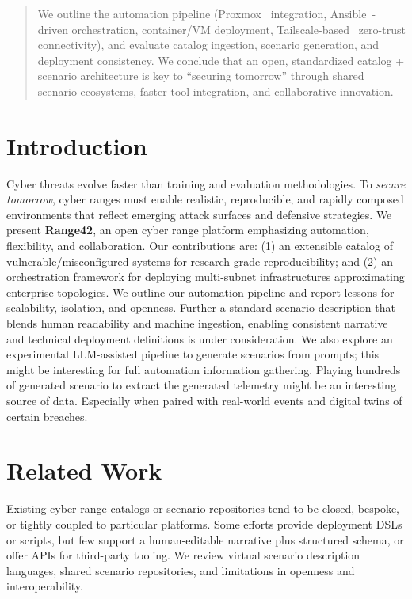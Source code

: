 \documentclass[11pt]{article}
\begin{document}
\begin{abstract}
We outline the automation pipeline (Proxmox~\cite{proxmox} integration, Ansible~\cite{ansible}-driven orchestration, container/VM deployment, Tailscale-based~\cite{tailscale} zero-trust connectivity), and evaluate catalog ingestion, scenario generation, and deployment consistency. We conclude that an open, standardized catalog + scenario architecture is key to “securing tomorrow” through shared scenario ecosystems, faster tool integration, and collaborative innovation.
\end{abstract}

\section{Introduction}
Cyber threats evolve faster than training and evaluation methodologies. To \emph{secure tomorrow}, cyber ranges must enable realistic, reproducible, and rapidly composed environments that reflect emerging attack surfaces and defensive strategies. We present \textbf{Range42}, an open cyber range platform emphasizing automation, flexibility, and collaboration. Our contributions are: (1) an extensible catalog of vulnerable/misconfigured systems for research-grade reproducibility; and (2) an orchestration framework for deploying multi-subnet infrastructures approximating enterprise topologies. We outline our automation pipeline and report lessons for scalability, isolation, and openness.
Further a standard scenario description that blends human readability and machine ingestion, enabling consistent narrative and technical deployment definitions is under consideration. We also explore an experimental LLM-assisted pipeline to generate scenarios from prompts; this might be interesting for full automation information gathering. Playing hundreds of generated scenario to extract the generated telemetry might be an interesting source of data. Especially when paired with real-world events and digital twins of certain breaches.


\section{Related Work}
Existing cyber range catalogs or scenario repositories tend to be closed, bespoke, or tightly coupled to particular platforms. Some efforts provide deployment DSLs or scripts, but few support a human-editable narrative plus structured schema, or offer APIs for third-party tooling. We review virtual scenario description languages, shared scenario repositories, and limitations in openness and interoperability.
\end{document}
